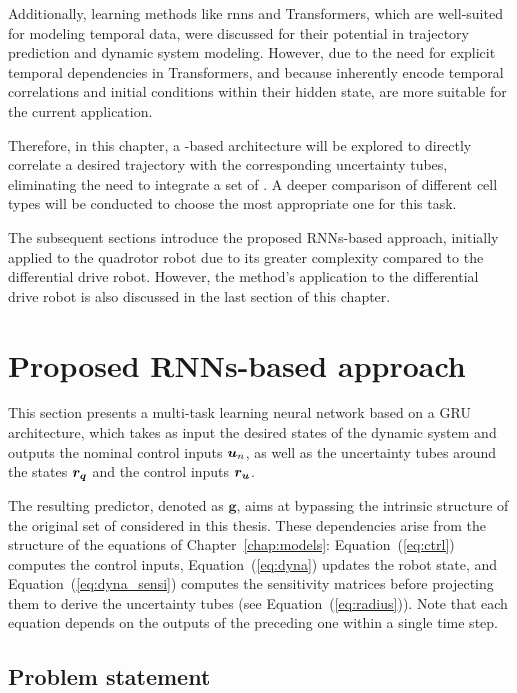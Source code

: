 Additionally, learning methods like \gls{rnns} and Transformers, which are well-suited for modeling temporal data, were discussed for their potential in trajectory prediction and dynamic system modeling. 
However, due to the need for explicit temporal dependencies in Transformers, and because  inherently encode temporal correlations and initial conditions within their hidden state,  are more suitable for the current application.

Therefore, in this chapter, a -based architecture will be explored to directly correlate a desired trajectory with the corresponding uncertainty tubes, eliminating the need to integrate a set of .
A deeper comparison of different  cell types will be conducted to choose the most appropriate one for this task.

The subsequent sections introduce the proposed RNNs-based approach, initially applied to the quadrotor robot due to its greater complexity compared to the differential drive robot. 
However, the method's application to the differential drive robot is also discussed in the last section of this chapter.

\section{Proposed RNNs-based approach} \label{sec:method}

This section presents a multi-task learning neural network based on a GRU architecture, which takes as input the desired states of the dynamic system and outputs the nominal control inputs $\boldsymbol{u}_n$, as well as the uncertainty tubes around the states $\boldsymbol{r_q}$ and the control inputs $\boldsymbol{r_u}$. 

The resulting predictor, denoted as $\boldsymbol{g}$, aims at bypassing the intrinsic structure of the original set of  considered in this thesis. 
These dependencies arise from the structure of the equations of Chapter~\ref{chap:models}: Equation~(\ref{eq:ctrl}) computes the control inputs, Equation~(\ref{eq:dyna}) updates the robot state, and Equation~(\ref{eq:dyna_sensi}) computes the sensitivity matrices before projecting them to derive the uncertainty tubes (see Equation~(\ref{eq:radius})). 
Note that each equation depends on the outputs of the preceding one within a single time step.

\subsection{Problem statement}

